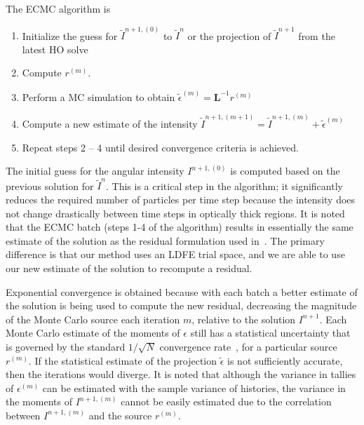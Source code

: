 \documentclass{mc2013}
\newcommand{\B}[1]{\ensuremath{\mathbf{#1}}}
\begin{document}
The ECMC algorithm is
\begin{enumerate}
    \item Initialize the guess for $\tilde{I}^{n+1,(0)}$ to $\tilde{I}^{n}$ or the
        projection of $\tilde{I}^{n+1}$ from the latest HO solve
\item Compute $r^{(m)}$.
\item Perform a MC simulation to obtain $\tilde{\epsilon}^{(m)} = \B L^{-1} r^{(m)}$
\item Compute a new estimate of the intensity $\tilde I^{n+1,(m+1)} = \tilde I^{n+1,(m)}
+ \tilde\epsilon^{(m)}$
\item Repeat steps 2 -- 4 until desired convergence criteria is achieved. 
\end{enumerate}
The initial guess for the angular intensity $I^{n+1,(0)}$ is computed based on the previous solution
for $\tilde{I}^{n}$. This is a critical step in the algorithm; it significantly reduces the required number of
particles per time step because the intensity does not change drastically between time steps in
optically thick regions.  It is noted that the ECMC batch (steps 1-4 of the
algorithm) results in essentially the same estimate of the solution as the residual
formulation used in~\cite{rmc}.  The primary difference is that our method uses an LDFE trial
space, and we are able to use our new estimate of the solution to recompute a
residual.

Exponential convergence is obtained because with each batch a
better estimate of the solution is being used to compute the new residual, decreasing
the magnitude of the Monte Carlo source each iteration $m$, relative to the solution
$I^{n+1}$.  Each Monte Carlo
estimate of the moments of $\epsilon$ still has a statistical uncertainty that is
governed by the standard $1/\sqrt{N}$ convergence rate~\cite{shultis_mc}, for a
particular source $r^{(m)}$.  If the statistical estimate of the projection $\tilde\epsilon$ is not sufficiently
accurate, then the iterations would diverge. It is noted that although the
variance in tallies of $\epsilon^{(m)}$ can be estimated with the sample variance of
histories, the variance in the moments of $I^{n+1,(m)}$ cannot be easily
estimated due to the correlation between $I^{n+1,(m)}$ and the source
$r^{(m)}$.
\end{document}
